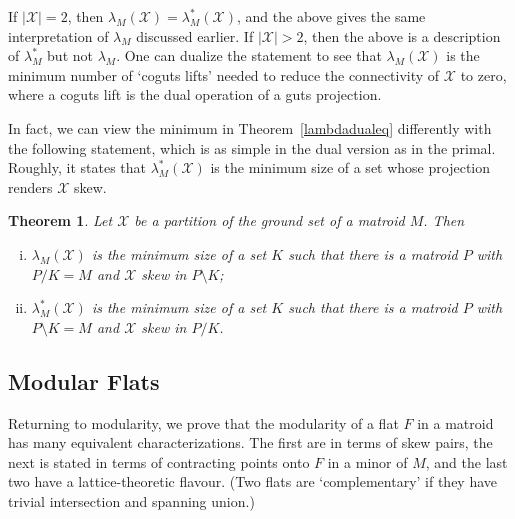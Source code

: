 \documentclass{amsart}
\theoremstyle{plain}
\newtheorem{theorem}{Theorem}[section]
\theoremstyle{definition}
\newcommand{\cX}{\mathcal{X}}
\newcommand{\del}{\!\setminus\!}
\newcommand{\con}{/}
\begin{document}
If $|\cX| = 2$, then $\lambda_M(\cX) = \lambda_M^*(\cX)$, and the above gives the same interpretation of $\lambda_M$
discussed earlier. If $|\cX| > 2$, then the above is a description of $\lambda_M^*$ but not $\lambda_M$. 
One can dualize the statement to see that $\lambda_M(\cX)$ is the minimum number of `coguts lifts' needed 
to reduce the connectivity of $\cX$ to zero, where a coguts lift is the dual operation of a guts projection. 

In fact, we can view the minimum in Theorem~\ref{lambdadualeq} differently 
with the following statement, which is as simple in the dual version as in the primal. 
Roughly, it states that $\lambda^*_M(\cX)$ is the minimum size of a set whose
projection renders $\cX$ skew. 

\begin{theorem}\label{lambdaminproj}
  Let $\cX$ be a partition of the ground set of a matroid $M$. Then 
  \begin{enumerate}[(i)]
    \item $\lambda_M(\cX)$ is the minimum size of a set $K$ such that 
      there is a matroid $P$ with $P \con K = M$ and $\cX$ skew in $P \del K$; 
    \item $\lambda^*_M(\cX)$ is the minimum size of a set $K$ such that 
      there is a matroid $P$ with $P \del K = M$ and $\cX$ skew in $P \con K$.  
  \end{enumerate}
\end{theorem}

\subsection*{Modular Flats}

Returning to modularity, 
we prove that the modularity of a flat $F$ in a matroid has many equivalent characterizations. 
The first are in terms of skew pairs, the next is stated in terms of 
contracting points onto $F$ in a minor of $M$, and the last two have a lattice-theoretic flavour. 
(Two flats are `complementary' if they have trivial intersection and spanning union.)
\end{document}
